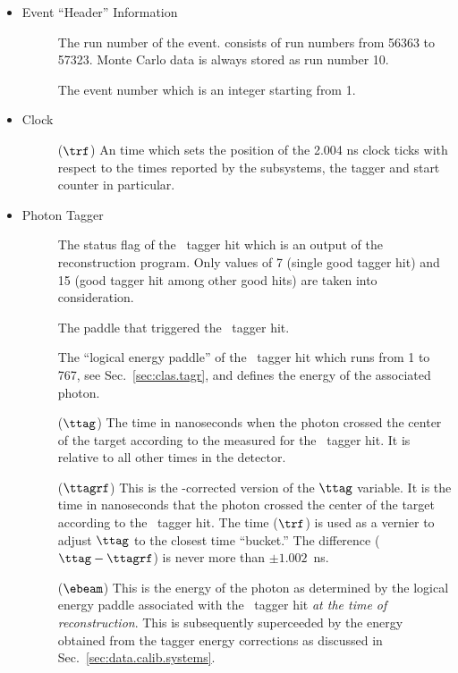 \begin{itemize}
    \item Event ``Header'' Information
    \begin{description}
        \item[] The run number of the event.  consists of run numbers from 56363 to 57323. Monte Carlo data is always stored as run number 10.
        \item[] The event number which is an integer starting from 1.
    \end{description}
    \item {} Clock
    \begin{description}
        \item[] ($\trf$) An  time which sets the position of the 2.004 ns clock ticks with respect to the times reported by the subsystems, the tagger and start counter in particular.
    \end{description}
    \item Photon Tagger
    \begin{description}
        \item[] The status flag of the \ith\ tagger hit which is an output of the reconstruction program. Only values of 7 (single good tagger hit) and 15 (good tagger hit among other good hits) are taken into consideration.
        \item[] The  paddle that triggered the \ith\ tagger hit.
        \item[] The ``logical energy paddle'' of the \ith\ tagger hit which runs from 1 to 767, see Sec.~\ref{sec:clas.tagr}, and defines the energy of the associated photon.
        \item[] ($\ttag$) The time in nanoseconds when the photon crossed the center of the target according to the  measured for the \ith\ tagger hit. It is relative to all other times in the detector.
        \item[] ($\ttagrf$) This is the -corrected version of the $\ttag$ variable. It is the time in nanoseconds that the photon crossed the center of the target according to the \ith\ tagger hit. The  time ($\trf$) is used as a vernier to adjust $\ttag$ to the closest  time ``bucket.'' The difference ($\ttag - \ttagrf$) is never more than $\pm 1.002$~ns.
        \item[] ($\ebeam$) This is the energy of the photon as determined by the logical energy paddle associated with the \ith\ tagger hit \emph{at the time of reconstruction}. This is subsequently superceeded by the energy obtained from the tagger energy corrections as discussed in Sec.~\ref{sec:data.calib.systems}.

\end{description}
\end{itemize}
